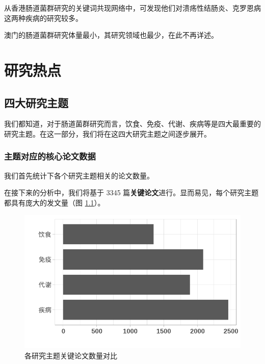 \documentclass[]{ctexbook}
\begin{document}
\hypertarget{htmlwidget-3f369558586d1f29ef92}{}

从香港肠道菌群研究的关键词共现网络中，可发现他们对溃疡性结肠炎、克罗恩病这两种疾病的研究较多。

\hypertarget{htmlwidget-2bcd30b20e1d795d9704}{}

澳门的肠道菌群研究体量最小，其研究领域也最少，在此不再详述。

\hypertarget{htmlwidget-93e1c4870ab0a3a586e4}{}

\hypertarget{htmlwidget-2c1327a2a505093dbd9d}{}

\hypertarget{part-ux7814ux7a76ux70edux70b9}{%
\part{研究热点}\label{part-ux7814ux7a76ux70edux70b9}}

\hypertarget{research-topic}{%
\chapter{四大研究主题}\label{research-topic}}

我们都知道，对于肠道菌群研究而言，饮食、免疫、代谢、疾病等是四大最重要的研究主题。在这一部分，我们将在这四大研究主题之间逐步展开。

\hypertarget{ux4e3bux9898ux5bf9ux5e94ux7684ux6838ux5fc3ux8bbaux6587ux6570ux636e}{%
\section{主题对应的核心论文数据}\label{ux4e3bux9898ux5bf9ux5e94ux7684ux6838ux5fc3ux8bbaux6587ux6570ux636e}}

我们首先统计下各个研究主题相关的论文数量。

在接下来的分析中，我们将基于 3345 篇\textbf{关键论文}进行。显而易见，每个研究主题都具有庞大的发文量（图 \ref{fig:topic-nRecord-in-core-articles}）。

\begin{figure}
\includegraphics[width=1\linewidth]{plots/topic-nRecord-in-core-articles-1} \caption{各研究主题关键论文数量对比}\label{fig:topic-nRecord-in-core-articles}
\end{figure}
\end{document}
